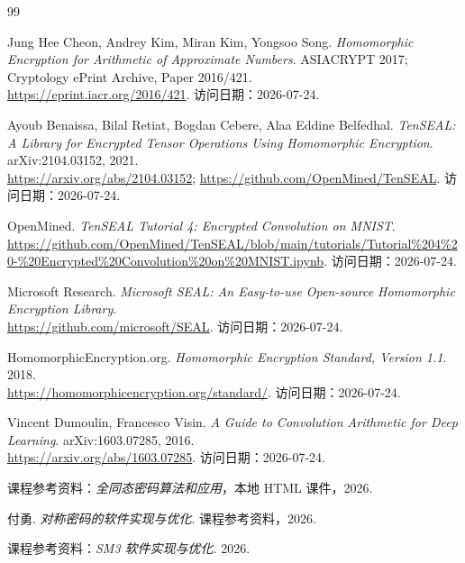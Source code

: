 \documentclass[UTF8,a4paper,zihao=-4]{ctexart}
\begin{document}
\clearpage
\begin{thebibliography}{99}
\raggedright

Jung Hee Cheon, Andrey Kim, Miran Kim, Yongsoo Song.
\textit{Homomorphic Encryption for Arithmetic of Approximate Numbers}.
ASIACRYPT 2017; Cryptology ePrint Archive, Paper 2016/421.\\
\url{https://eprint.iacr.org/2016/421}. 访问日期：2026-07-24.

Ayoub Benaissa, Bilal Retiat, Bogdan Cebere, Alaa Eddine Belfedhal.
\textit{TenSEAL: A Library for Encrypted Tensor Operations Using Homomorphic Encryption}.
arXiv:2104.03152, 2021.\\
\url{https://arxiv.org/abs/2104.03152};
\url{https://github.com/OpenMined/TenSEAL}. 访问日期：2026-07-24.

OpenMined. \textit{TenSEAL Tutorial 4: Encrypted Convolution on MNIST}.\\
\url{https://github.com/OpenMined/TenSEAL/blob/main/tutorials/Tutorial\%204\%20-\%20Encrypted\%20Convolution\%20on\%20MNIST.ipynb}.
访问日期：2026-07-24.

Microsoft Research. \textit{Microsoft SEAL: An Easy-to-use Open-source Homomorphic Encryption Library}.\\
\url{https://github.com/microsoft/SEAL}. 访问日期：2026-07-24.

HomomorphicEncryption.org. \textit{Homomorphic Encryption Standard, Version 1.1}. 2018.\\
\url{https://homomorphicencryption.org/standard/}. 访问日期：2026-07-24.

Vincent Dumoulin, Francesco Visin.
\textit{A Guide to Convolution Arithmetic for Deep Learning}.
arXiv:1603.07285, 2016.\\
\url{https://arxiv.org/abs/1603.07285}. 访问日期：2026-07-24.

课程参考资料：\textit{全同态密码算法和应用}，本地 HTML 课件，2026.

付勇. \textit{对称密码的软件实现与优化}. 课程参考资料，2026.

课程参考资料：\textit{SM3 软件实现与优化}. 2026.

\end{thebibliography}
\end{document}

